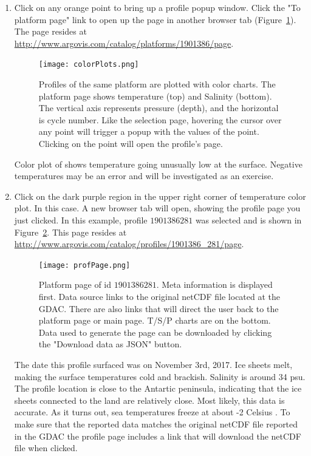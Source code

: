 \begin{enumerate}
\item Click on any orange point to bring up a profile popup window. Click the "To platform page" link to open up the page in another browser tab (Figure~\ref{fig:colorPlots}). The page resides at \url{http://www.argovis.com/catalog/platforms/1901386/page}.

\begin{figure}[H]
\begin{minipage}{6in}
\centering
\texttt{[image: colorPlots.png]}
\caption{\label{fig:colorPlots} Profiles of the same platform are plotted with color charts. The platform page shows temperature (top) and Salinity (bottom). The vertical axis represents pressure (depth), and the horizontal is cycle number. Like the selection page, hovering the cursor over any point will trigger a popup with the values of the point. Clicking on the point will open the profile's page.}
\end{minipage}
\end{figure}

Color plot of shows temperature going unusually low at the surface. Negative temperatures may be an error and will be investigated as an exercise.

\item Click on the dark purple region in the upper right corner of temperature color plot. In this case. A new browser tab will open, showing the profile page you just clicked. In this example, profile $1901386$\textunderscore$281$ was selected and is shown in Figure~\ref{fig:profilePage}. This page resides at \url{http://www.argovis.com/catalog/profiles/1901386_281/page}.

\begin{figure}[H]
\begin{minipage}{6in}
\centering
\texttt{[image: profPage.png]}
\caption{\label{fig:profilePage} Platform page of id $1901386$\textunderscore$281$. Meta information is displayed first. Data source links to the original netCDF file located at the GDAC. There are also links that will direct the user back to the platform page or main page. T/S/P charts are on the bottom. Data used to generate the page can be downloaded by clicking the "Download data as JSON" button.}
\end{minipage}
\end{figure}

The date this profile surfaced was on November 3rd, 2017. Ice sheets melt, making the surface temperatures cold and brackish. Salinity is around 34 \gls{psu}. The profile location is close to the Antartic peninsula, indicating that the ice sheets connected to the land are relatively close. Most likely, this data is accurate. As it turns out, sea temperatures freeze at about -2 Celsius \cite{noaaOcean}. To make sure that the reported data matches the original netCDF file reported in the GDAC the profile page includes a link that will download the netCDF file when clicked. 


\end{enumerate}
